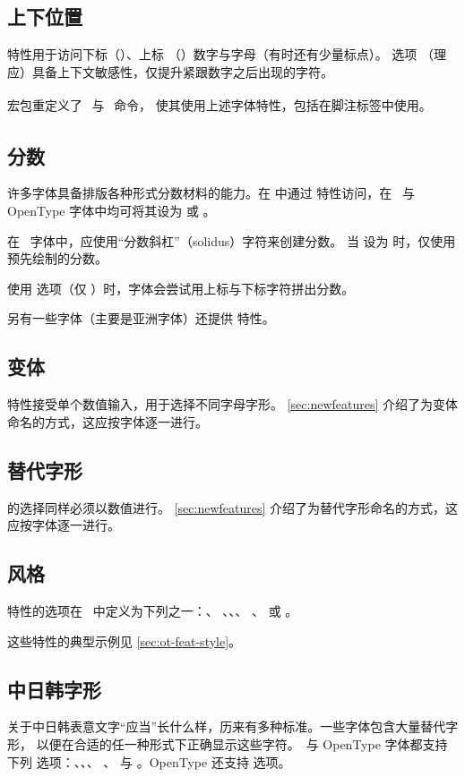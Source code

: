 \documentclass[a4paper]{l3doc}
\begin{document}
\subsection{上下位置}
 特性用于访问下标（）、上标
（）数字与字母（有时还有少量标点）。 选项
（理应）具备上下文敏感性，仅提升紧跟数字之后出现的字符。

 宏包重定义了 \cmd\textsubscript\ 与 \cmd\textsuperscript\ 命令，
使其使用上述字体特性，包括在脚注标签中使用。

\subsection{分数}
许多字体具备排版各种形式分数材料的能力。在  中通过
 特性访问，在 \AAT\ 与 OpenType 字体中均可将其设为
 或 。

在 \AAT\ 字体中，应使用“分数斜杠”（solidus）字符来创建分数。
当  设为  时，仅使用预先绘制的分数。

使用  选项（仅 \AAT）时，字体会尝试用上标与下标字符拼出分数。

另有一些字体（主要是亚洲字体）还提供  特性。

\subsection{变体}
 特性接受单个数值输入，用于选择不同字母字形。
\vref{sec:newfeatures} 介绍了为变体命名的方式，这应按字体逐一进行。

\subsection{替代字形}
 的选择同样必须以数值进行。
\vref{sec:newfeatures} 介绍了为替代字形命名的方式，这应按字体逐一进行。


\subsection{风格}
 特性的选项在 \AAT\ 中定义为下列之一：、
、、、
\footnotemark、 或 。

这些特性的典型示例见 \ref{sec:ot-feat-style}。

\subsection{中日韩字形}
关于中日韩表意文字“应当”长什么样，历来有多种标准。一些字体包含大量替代字形，
以便在合适的任一种形式下正确显示这些字符。\AAT\ 与 OpenType 字体都支持下列
 选项：、、、
、 与 。OpenType 还支持  选项。
\end{document}
